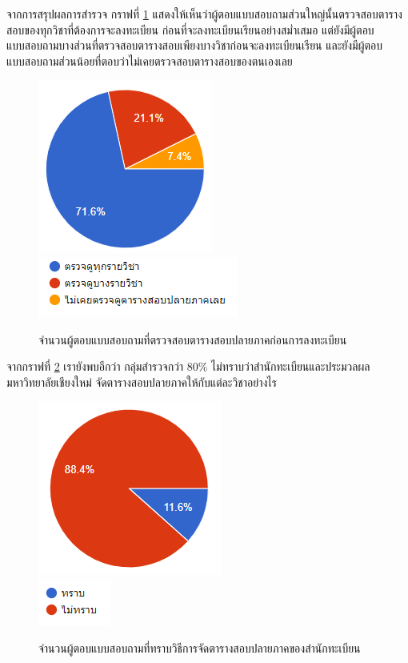 จากการสรุปผลการสำรวจ กราฟที่ \ref{fig:check_before_enrollment} แสดงให้เห็นว่าผู้ตอบแบบสอบถามส่วนใหญ่นั้นตรวจสอบตารางสอบของทุกวิชาที่ต้องการจะลงทะเบียน
ก่อนที่จะลงทะเบียนเรียนอย่างสม่ำเสมอ แต่ยังมีผู้ตอบแบบสอบถามบางส่วนที่ตรวจสอบตารางสอบเพียงบางวิชาก่อนจะลงทะเบียนเรียน และยังมีผู้ตอบแบบสอบถามส่วนน้อยที่ตอบว่าไม่เคยตรวจสอบตารางสอบของตนเองเลย
%
\begin{figure}
  \begin{center}
    \includegraphics{images/checking_schedule_before_enrollment.png}\\[2ex]
    \includegraphics{images/legend_for_checking_schedule_before_enrollment.png}
  \end{center}
  \caption[จำนวนผู้ตอบแบบสอบถามที่ตรวจสอบตารางสอบปลายภาคก่อนการลงทะเบียน]{จำนวนผู้ตอบแบบสอบถามที่ตรวจสอบตารางสอบปลายภาคก่อนการลงทะเบียน}
  \label{fig:check_before_enrollment}     
\end{figure}
%
จากกราฟที่ \ref{fig:registration_exam} เรายังพบอีกว่า กลุ่มสำรวจกว่า 80\% ไม่ทราบว่าสำนักทะเบียนและประมวลผล มหาวิทยาลัยเชียงใหม่ จัดตารางสอบปลายภาคให้กับแต่ละวิชาอย่างไร
%
\begin{figure}
  \begin{center}
    \includegraphics{images/registration_exam.png}\\[2ex]
    \includegraphics{images/legend_for_registration_exam.png}
  \end{center}
  \caption[จำนวนผู้ตอบแบบสอบถามที่ทราบวิธีการจัดตารางสอบปลายภาคของสำนักทะเบียน]{จำนวนผู้ตอบแบบสอบถามที่ทราบวิธีการจัดตารางสอบปลายภาคของสำนักทะเบียน}
  \label{fig:registration_exam}     
\end{figure}

